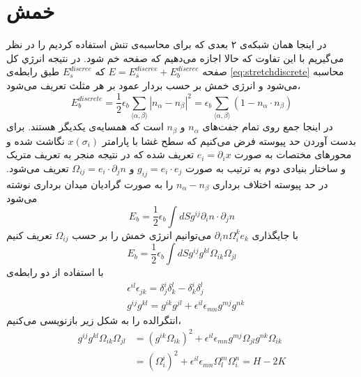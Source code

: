 \section{خمش}
در اینجا همان شبکه‌ی ۲ بعدی که برای محاسبه‌ی تنش استفاده کردیم را در نظر می‌گیریم با این تفاوت که حالا اجازه می‌دهیم که صفحه خم شود. در نتیجه انرژي کل صفحه 
$E=E_s^{discree}+E_b^{discree}$
که $E_s^{discree}$
طبق رابطه‌ی 
\ref{eq:stretchdiscrete}
محاسبه می‌شود و انرژی خمش بر حسب بردار عمود بر هر مثلث تعریف می‌شود،
\begin{equation}
E_b^{discrete}=\frac{1}{2}\epsilon_b\sum_{\langle\alpha,\beta\rangle}|n_\alpha-n_\beta|^2=\epsilon_b\sum_{\langle\alpha,\beta\rangle}\left(1-n_\alpha\cdot n_\beta\right)
\label{eq:bending}
\end{equation}
در اینجا جمع روی تمام جفت‌های 
$n_\alpha$
و 
$n_\beta$ 
است که همسایه‌ی یکدیگر هستند. برای بدست‌ آوردن حد پیوسته‌ فرض می‌کنیم که سطح غشا با پارامتر 
$x(\sigma_i)$
نگاشت شده و محورهای مختصات به صورت 
$e_i=\partial_ix$
تعریف شده که در نتیجه منجر به تعریف متریک و ساختار بنیادی دوم
 به ترتیب به صورت 
$g_{ij}=e_i\cdot e_j$
و
$\Omega_{ij}=e_i\cdot\partial_jn$
تعریف می‌شود. در حد پیوسته اختلاف برداری 
$n_\alpha-n_\beta$
را به صورت گرادیان میدان برداری نوشته می‌شود
\begin{equation}
E_b=\frac{1}{2}\epsilon_b\int dSg^{ij}\partial_in\cdot\partial_jn
\end{equation}
با جایگذاری 
$\partial_in\Omega_i^ke_k$
می‌توانیم انرژی خمش را بر حسب 
$\Omega_{ij}$
تعریف کنیم
\begin{equation}
E_b=\frac{1}{2}\epsilon_b\int dSg^{ij}g^{kl}\Omega_{ik}\Omega_{jl}
\end{equation}
با استفاده از دو رابطه‌ی 
\begin{equation}
\begin{aligned}
&\epsilon^{il}\epsilon_{jk}=\delta_j^i\delta_k^l-\delta_k^i\delta_j^l\\
&g^{ij}g^{kl}=g^{ik}g^{jl}+\epsilon^{il}\epsilon_{mn}g^{mj}g^{nk}
\end{aligned}
\end{equation}
انتگرالده را به شکل زیر بازنویسی می‌کنیم،
\begin{equation}
\begin{aligned}
g^{ij}g^{kl}\Omega_{ik}\Omega_{jl}&=(g^{ik}\Omega_{ik})^2+\epsilon^{il}\epsilon_{mn}g^{mj}\Omega_{jl}g^{nk}\Omega_{ik}\\
&=(\Omega_i^i)^2+\epsilon^{il}\epsilon_{mn}\Omega_l^m\Omega_i^n=H-2K
\end{aligned}
\end{equation}



















